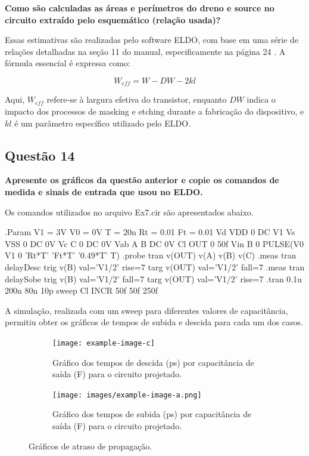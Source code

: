 ﻿\documentclass[12pt,a4paper]{article}
\begin{document}
	\textbf{Como são calculadas as áreas e perímetros do dreno e source no circuito extraído pelo esquemático (relação usada)?}

Essas estimativas são realizadas pelo software ELDO, com base em uma série de relações detalhadas na seção 11 do manual, especificamente na página 24 \cite{ref1}. A fórmula essencial é expressa como:

$$
W_{eff} = W - DW - 2kl
$$

Aqui, $W_{eff}$ refere-se à largura efetiva do transistor, enquanto $DW$ indica o impacto dos processos de masking e etching durante a fabricação do dispositivo, e $kl$ é um parâmetro específico utilizado pelo ELDO.

\subsection*{Questão 14}

	\textbf{Apresente os gráficos da questão anterior e copie os comandos de medida e sinais de entrada que usou no ELDO.}

Os comandos utilizados no arquivo Ex7.cir são apresentados abaixo.

\begin{codeblock}[title={Comandos ELDO}, label={lst:eldo_commands}, listing options={language=TeX}]
.Param V1 = 3V V0 = 0V T = 20n Rt = 0.01 Ft = 0.01
Vd VDD 0 DC V1
Vs VSS 0 DC 0V
Vc C 0 DC 0V
Vab A B DC 0V
Cl OUT 0 50f
Vin B 0 PULSE(V0 V1 0 'Rt*T' 'Ft*T' '0.49*T' T)
.probe tran v(OUT) v(A) v(B) v(C)
.meas tran delayDesc trig v(B) val='V1/2' rise=7 targ v(OUT) val='V1/2'
fall=7
.meas tran delaySobe trig v(B) val='V1/2' fall=7 targ v(OUT) val='V1/2'
rise=7
.tran 0.1u 200n 80n 10p sweep Cl INCR 50f 50f 250f
\end{codeblock}

A simulação, realizada com um sweep para diferentes valores de capacitância, permitiu obter os gráficos de tempos de subida e descida para cada um dos casos.

\begin{figure}[H]
    \centering
    \begin{subfigure}[b]{0.48\textwidth}
        \texttt{[image: example-image-c]}
        \caption{Gráfico dos tempos de descida (ps) por capacitância de saída (F) para o circuito projetado.}
        \label{fig:delay_descida}
    \end{subfigure}
    \hfill
    \begin{subfigure}[b]{0.48\textwidth}
        \texttt{[image: images/example-image-a.png]}
        \caption{Gráfico dos tempos de subida (ps) por capacitância de saída (F) para o circuito projetado.}
        \label{fig:delay_subida}
    \end{subfigure}
    \caption{Gráficos de atraso de propagação.}
    \label{fig:delay_graphs}
\end{figure}
\end{document}
